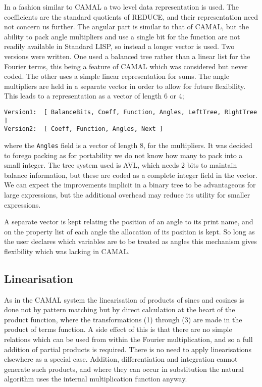 In a fashion similar to CAMAL a two level data representation is used.
The coefficients are the standard quotients of REDUCE, and their
representation need not concern us further.  The angular part is
similar to that of CAMAL, but the ability to pack angle multipliers
and use a single bit for the function are not readily available in
Standard LISP, so instead a longer vector is used.  Two versions were
written.  One used a balanced tree rather than a linear list for the
Fourier terms, this being a feature of CAMAL which was considered but
never coded.  The other uses a simple linear representation for sums.
The angle multipliers are held in a separate vector in order to allow
for future flexibility.  This leads to a representation as a vector of
length 6 or 4;
\begin{verbatim}
Version1:  [ BalanceBits, Coeff, Function, Angles, LeftTree, RightTree ]
Version2:  [ Coeff, Function, Angles, Next ]
\end{verbatim}
where the {\tt Angles} field is a vector of length 8, for the
multipliers.  It was decided to forego packing as for portability we
do not know how many to pack into a small integer.  The tree system
used is AVL, which needs 2 bits to maintain balance information, but
these are coded as a complete integer field in the vector.  We can
expect the improvements implicit in a binary tree to be advantageous
for large expressions, but the additional overhead may reduce its
utility for smaller expressions.

A separate vector is kept relating the position of an angle to its
print name, and on the property list of each angle the allocation of
its position is kept.  So long as the user declares which variables
are to be treated as angles this mechanism gives flexibility which was
lacking in CAMAL.

\subsection{Linearisation}

As in the CAMAL system the linearisation of products of sines and
cosines is done not by pattern matching but by direct calculation at
the heart of the product function, where the transformations (1)
through (3) are made in the product of terms function.  A side effect
of this is that there are no simple relations which can be used from
within the Fourier multiplication, and so a full addition of partial
products is required.  There is no need to apply linearisations
elsewhere as a special case.  Addition, differentiation and
integration cannot generate such products, and where they can occur in
substitution the natural algorithm uses the internal multiplication
function anyway.

